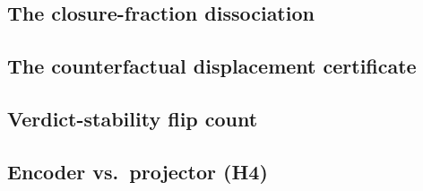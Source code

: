 \documentclass[11pt]{article}
\begin{document}
\subsection{The closure-fraction dissociation}
\subsection{The counterfactual displacement certificate}
\subsection{Verdict-stability flip count}
\subsection{Encoder vs.\ projector (H4)}
\end{document}
